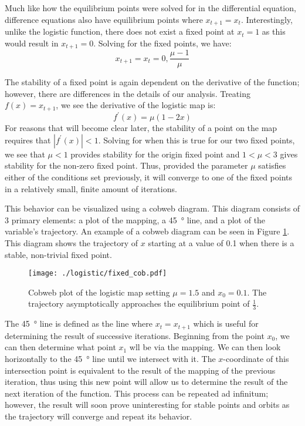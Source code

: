 Much like how the equilibrium points were solved for in the differential equation, difference equations also have equilibrium points where $x_{t+1}=x_t$. Interestingly, unlike the logistic function, there does not exist a fixed point at $x_t=1$ as this would result in $x_{t+1}=0$. Solving for the fixed points, we have:
\begin{equation}
    x_{t+1}=x_t=0,\frac{\mu-1}{\mu}
\end{equation}

The stability of a fixed point is again dependent on the derivative of the function; however, there are differences in the details of our analysis. Treating $f(x)=x_{t+1}$, we see the derivative of the logistic map is:
\begin{equation}
    f^\prime(x)=\mu(1-2x)
\end{equation}
For reasons that will become clear later, the stability of a point on the map requires that $|f^\prime(x)|<1$. Solving for when this is true for our two fixed points, we see that $\mu<1$ provides stability for the origin fixed point and $1<\mu<3$ gives stability for the non-zero fixed point. Thus, provided the parameter $\mu$ satisfies either of the conditions set previously, it will converge to one of the fixed points in a relatively small, finite amount of iterations. 

This behavior can be visualized using a cobweb diagram. This diagram consists of 3 primary elements: a plot of the mapping, a \SI{45}{\degree} line, and a plot of the variable's trajectory. An example of a cobweb diagram can be seen in Figure \ref{log_fixed_cob}. This diagram shows the trajectory of $x$ starting at a value of 0.1 when there is a stable, non-trivial fixed point.

\begin{figure}
    \centering
    \texttt{[image: ./logistic/fixed\_cob.pdf]}
    \caption{Cobweb plot of the logistic map setting $\mu=1.5$ and $x_0=0.1$. The trajectory asymptotically approaches the equilibrium point of $\frac{1}{3}$.}
    \label{log_fixed_cob}
\end{figure}
The \SI{45}{\degree} line is defined as the line where $x_t=x_{t+1}$ which is useful for determining the result of successive iterations. Beginning from the point $x_0$, we can then determine what point $x_1$ wll be via the mapping. We can then look horizontally to the \SI{45}{\degree} line until we intersect with it. The $x$-coordinate of this intersection point is equivalent to the result of the mapping of the previous iteration, thus using this new point will allow us to determine the result of the next iteration of the function. This process can be repeated ad infinitum; however, the result will soon prove uninteresting for stable points and orbits as the trajectory will converge and repeat its behavior.

